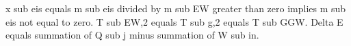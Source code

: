 x sub eis equals m sub eis divided by m sub EW greater than zero implies m sub eis not equal to zero.  
T sub EW,2 equals T sub g,2 equals T sub GGW.  
Delta E equals summation of Q sub j minus summation of W sub in.